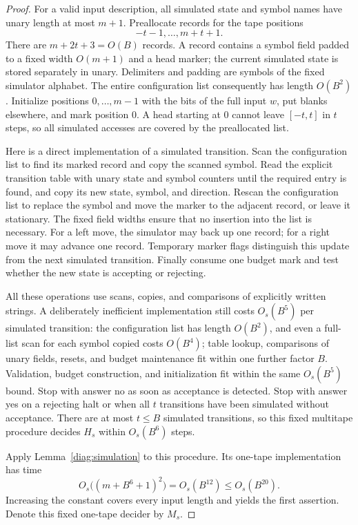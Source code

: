 \begin{proof}
For a valid input description, all simulated state and symbol names have
unary length at most $m+1$.  Preallocate records for the tape positions
\[
                         -t-1,\ldots,m+t+1.
\]
There are $m+2t+3=O(B)$ records.  A record contains a symbol field padded
to a fixed width $O(m+1)$ and a head marker; the current simulated state
is stored separately in unary.  Delimiters and padding are symbols of
the fixed simulator alphabet.  The entire configuration list consequently
has length $O(B^2)$.  Initialize positions $0,\ldots,m-1$ with the bits of
the full input $w$, put blanks elsewhere, and mark position $0$.  A head
starting at $0$ cannot leave $[-t,t]$ in $t$ steps, so all simulated accesses
are covered by the preallocated list.

Here is a direct implementation of a simulated transition.  Scan the
configuration list to find its marked record and copy the scanned symbol.
Read the explicit transition table with unary state and symbol counters
until the required entry is found, and copy its new state, symbol, and
direction.  Rescan the configuration list to replace the symbol and move
the marker to the adjacent record, or leave it stationary.  The fixed
field widths ensure that no insertion into the list is necessary.  For a
left move, the simulator may back up one record; for a right move it may
advance one record.  Temporary marker flags distinguish this update from
the next simulated transition.  Finally consume one budget mark and test
whether the new state is accepting or rejecting.

All these operations use scans, copies, and comparisons of explicitly
written strings.  A deliberately inefficient implementation still costs
$O_s(B^5)$ per simulated transition: the configuration list has length
$O(B^2)$, and even a full-list scan for each symbol copied costs $O(B^4)$;
table lookup, comparisons of unary fields, resets, and budget maintenance
fit within one further factor $B$.  Validation, budget construction, and
initialization fit within the same $O_s(B^5)$ bound.  Stop with answer no
as soon as acceptance is detected.  Stop with answer yes on a rejecting
halt or when all $t$ transitions have been simulated without acceptance.
There are at most $t\leq B$ simulated transitions, so this fixed multitape
procedure decides $H_s$ within $O_s(B^6)$ steps.

Apply Lemma~\ref{diag:simulation} to this procedure.  Its one-tape
implementation has time
\[
 O_s\bigl((m+B^6+1)^2\bigr)=O_s(B^{12})
                                      \leq O_s(B^{20}).
\]
Increasing the constant covers every input length and yields the first
assertion.  Denote this fixed one-tape decider by $M_s$.


\end{proof}
